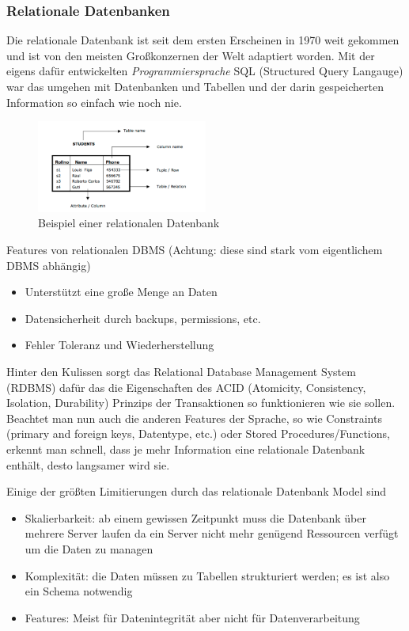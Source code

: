 \subsubsection{Relationale Datenbanken}
\label{subsec:relationaleDB}

Die relationale Datenbank ist seit dem ersten Erscheinen in 1970 weit gekommen und ist von den meisten Großkonzernen der Welt adaptiert worden. Mit der eigens dafür entwickelten \textit{Programmiersprache} SQL (Structured Query Langauge) war das umgehen mit Datenbanken und Tabellen und der darin gespeicherten Information so einfach wie noch nie.

\begin{figure}[!htb]\centering
	\includegraphics[width=0.5\textwidth]{images/relationaleTabelle}
	\caption{Beispiel einer relationalen Datenbank}
\end{figure}

Features von relationalen DBMS (Achtung: diese sind stark vom eigentlichem DBMS abhängig)
\begin{itemize}
\item Unterstützt eine große Menge an Daten
\item Datensicherheit durch backups, permissions, etc.
\item Fehler Toleranz und Wiederherstellung
\end{itemize}

Hinter den Kulissen sorgt das Relational Database Management System (RDBMS) dafür das die Eigenschaften des ACID (Atomicity, Consistency, Isolation, Durability) Prinzips der Transaktionen so funktionieren wie sie sollen. Beachtet man nun auch die anderen Features der Sprache, so wie Constraints (primary and foreign keys, Datentype, etc.) oder Stored Procedures/Functions, erkennt man schnell, dass je mehr Information eine relationale Datenbank enthält, desto langsamer wird sie.

Einige der größten Limitierungen \cite{MELD.CH2-relationaleDB.rdbmsBuch} durch das relationale Datenbank Model sind
\begin{itemize}
\item Skalierbarkeit: ab einem gewissen Zeitpunkt muss die Datenbank über mehrere Server laufen da ein Server nicht mehr genügend Ressourcen verfügt um die Daten zu managen
\item Komplexität: die Daten müssen zu Tabellen strukturiert werden; es ist also ein Schema notwendig
\item Features: Meist für Datenintegrität aber nicht für Datenverarbeitung 
\end{itemize}


